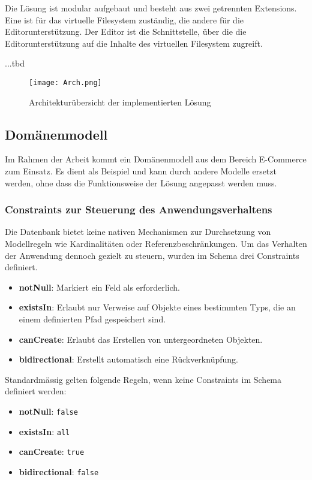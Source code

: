 Die Lösung ist modular aufgebaut und besteht aus zwei getrennten Extensions. Eine ist für das virtuelle Filesystem zuständig, die andere für die Editorunterstützung. Der Editor ist die Schnittstelle, über die die Editorunterstützung auf die Inhalte des virtuellen Filesystem zugreift.

...tbd


\begin{figure}[H]
  \centering
  \texttt{[image: Arch.png]}
  \caption{Architekturübersicht der implementierten Lösung}
  \label{fig:arch_modell}
\end{figure}

\subsection{Domänenmodell}
Im Rahmen der Arbeit kommt ein Domänenmodell aus dem Bereich E-Commerce zum Einsatz. Es dient als Beispiel und kann durch andere Modelle ersetzt werden, ohne dass die Funktionsweise der Lösung angepasst werden muss.


\subsubsection*{Constraints zur Steuerung des Anwendungsverhaltens}
Die Datenbank bietet keine nativen Mechanismen zur Durchsetzung von Modellregeln wie Kardinalitäten oder Referenzbeschränkungen. Um das Verhalten der Anwendung dennoch gezielt zu steuern, wurden im Schema drei Constraints definiert.

\begin{itemize}
 \item \textbf{notNull}: Markiert ein Feld als erforderlich.
  \item \textbf{existsIn}: Erlaubt nur Verweise auf Objekte eines bestimmten Typs, die an einem definierten Pfad gespeichert sind.
  \item \textbf{canCreate}: Erlaubt das Erstellen von untergeordneten Objekten.
  \item \textbf{bidirectional}: Erstellt automatisch eine Rückverknüpfung.
\end{itemize}

Standardmässig gelten folgende Regeln, wenn keine Constraints im Schema definiert werden: 

\begin{itemize}
  \item \textbf{notNull}: \texttt{false}
  \item \textbf{existsIn}: \texttt{all}
  \item \textbf{canCreate}: \texttt{true}
  \item \textbf{bidirectional}: \texttt{false}
\end{itemize}

